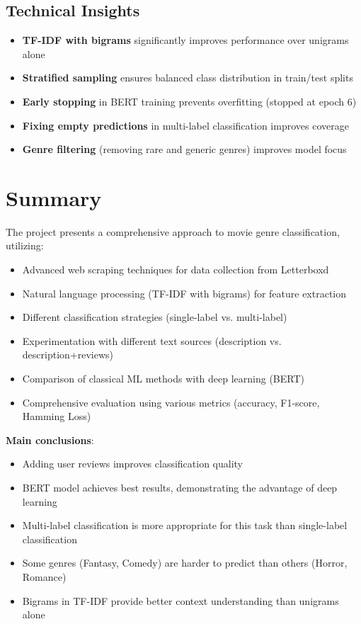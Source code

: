 \documentclass[12pt,a4paper]{article}
\begin{document}
\subsection{Technical Insights}

\begin{itemize}
    \item \textbf{TF-IDF with bigrams} significantly improves performance over unigrams alone
    \item \textbf{Stratified sampling} ensures balanced class distribution in train/test splits
    \item \textbf{Early stopping} in BERT training prevents overfitting (stopped at epoch 6)
    \item \textbf{Fixing empty predictions} in multi-label classification improves coverage
    \item \textbf{Genre filtering} (removing rare and generic genres) improves model focus
\end{itemize}

\section{Summary}

The project presents a comprehensive approach to movie genre classification, utilizing:
\begin{itemize}
    \item Advanced web scraping techniques for data collection from Letterboxd
    \item Natural language processing (TF-IDF with bigrams) for feature extraction
    \item Different classification strategies (single-label vs. multi-label)
    \item Experimentation with different text sources (description vs. description+reviews)
    \item Comparison of classical ML methods with deep learning (BERT)
    \item Comprehensive evaluation using various metrics (accuracy, F1-score, Hamming Loss)
\end{itemize}

\textbf{Main conclusions}:
\begin{itemize}
    \item Adding user reviews improves classification quality
    \item BERT model achieves best results, demonstrating the advantage of deep learning
    \item Multi-label classification is more appropriate for this task than single-label classification
    \item Some genres (Fantasy, Comedy) are harder to predict than others (Horror, Romance)
    \item Bigrams in TF-IDF provide better context understanding than unigrams alone
\end{itemize}
\end{document}
